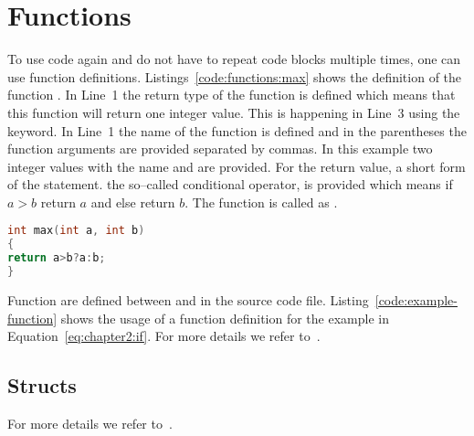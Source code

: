 \section{Functions}
To use code again and do not have to repeat code blocks multiple times, one can use function definitions. Listings~\ref{code:functions:max} shows the definition of the function . In Line~1 the return type  of the function is defined which means that this function will return one integer value. This is happening in Line~3 using the  keyword. In Line~1 the name of the function  is defined and in the parentheses the function arguments are provided separated by commas. In this example two integer values with the name  and  are provided. For the return value, a short form of the  statement. the so--called conditional operator, is provided which means if $a>b$ return $a$ and else return $b$. The function is called as .   \\

\begin{lstlisting}[language=c++,caption={Example for a function definition to compute the maximum of two numbers.\label{code:functions:max}},float,floatplacement=tb]
int max(int a, int b)
{
return a>b?a:b;
}
\end{lstlisting}

Function are defined between  and  in the source code file. Listing~\ref{code:example-function} shows the usage of a function definition for the example in Equation~\ref{eq:chapter2:if}. For more details we refer to~\cite[Chapter~4]{andrew2000accelerated}.




\subsection{Structs}
For more details we refer to~\cite[Chapter~4]{andrew2000accelerated}.
